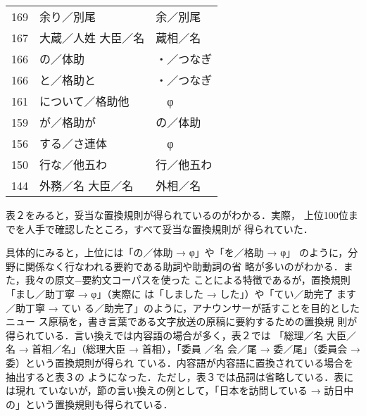 \begin{table}
\begin{center}
\begin{tabular}{|r|l|l|}
   169 & 余り／別尾 & 余／別尾\\
   167 & 大蔵／人姓 大臣／名 & 蔵相／名\\
   166 & の／体助 & ・／つなぎ\\
   166 & と／格助と & ・／つなぎ\\
   161 & について／格助他 & 　φ\\
   159 & が／格助が & の／体助\\
   156 & する／さ連体 & 　φ\\
   150 & 行な／他五わ & 行／他五わ\\
   144 & 外務／名 大臣／名 & 外相／名\\ \hline
  \end{tabular}
 \end{center}
\end{table}

表２をみると，妥当な置換規則が得られているのがわかる．実際，
上位100位までを人手で確認したところ，すべて妥当な置換規則が
得られていた．

具体的にみると，上位には「の／体助 → φ」や「を／格助 → φ」
のように，分野に関係なく行なわれる要約である助詞や助動詞の省
略が多いのがわかる．また，我々の原文−要約文コーパスを使った
ことによる特徴であるが，置換規則「まし／助丁寧 → φ」（実際に
は「しました → した」）や「てい／助完了 ます／助丁寧 → てい
る／助完了」のように，アナウンサーが話すことを目的としたニュー
ス原稿を，書き言葉である文字放送の原稿に要約するための置換規
則が得られている．言い換えでは内容語の場合が多く，表２では
「総理／名 大臣／名 → 首相／名」（総理大臣 → 首相），「委員
／名 会／尾 → 委／尾」（委員会 → 委）という置換規則が得られ
ている．内容語が内容語に置換されている場合を抽出すると表３の
ようになった．ただし，表３では品詞は省略している．表には現れ
ていないが，節の言い換えの例として，「日本を訪問している → 
訪日中の」という置換規則も得られている．

